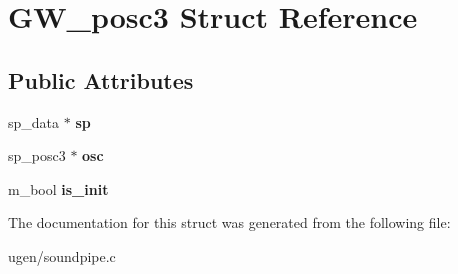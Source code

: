 \hypertarget{structGW__posc3}{}\section{G\+W\+\_\+posc3 Struct Reference}
\label{structGW__posc3}
\subsection*{Public Attributes}
\begin{DoxyCompactItemize}
\item 
\hypertarget{structGW__posc3_ada74aa673b160851f35a6a68d8ed3140}{}\label{structGW__posc3_ada74aa673b160851f35a6a68d8ed3140} 
sp\+\_\+data $\ast$ {\bfseries sp}
\item 
\hypertarget{structGW__posc3_aae2becc7db1676d16665aa498b382fe7}{}\label{structGW__posc3_aae2becc7db1676d16665aa498b382fe7} 
sp\+\_\+posc3 $\ast$ {\bfseries osc}
\item 
\hypertarget{structGW__posc3_a9c843a744fbb53522fcb9db2c0c4fe24}{}\label{structGW__posc3_a9c843a744fbb53522fcb9db2c0c4fe24} 
m\+\_\+bool {\bfseries is\+\_\+init}
\end{DoxyCompactItemize}


The documentation for this struct was generated from the following file\+:\begin{DoxyCompactItemize}
\item 
ugen/soundpipe.\+c\end{DoxyCompactItemize}
